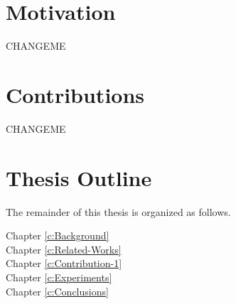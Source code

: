 \hinttext{}

\section{Motivation}
\label{s:Motivation}

CHANGEME

\section{Contributions}
\label{s:Contributions}

CHANGEME

\section{Thesis Outline}
\label{s:Outline}

The remainder of this thesis is organized as follows. \hinttext{}

\begin{description}

  \item[Chapter \ref{c:Background}] 
  
  \item[Chapter \ref{c:Related-Works}] 
  
  \item[Chapter \ref{c:Contribution-1}] 
    
  \item[Chapter \ref{c:Experiments}] 
  
  \item[Chapter \ref{c:Conclusions}] 
  
\end{description}



